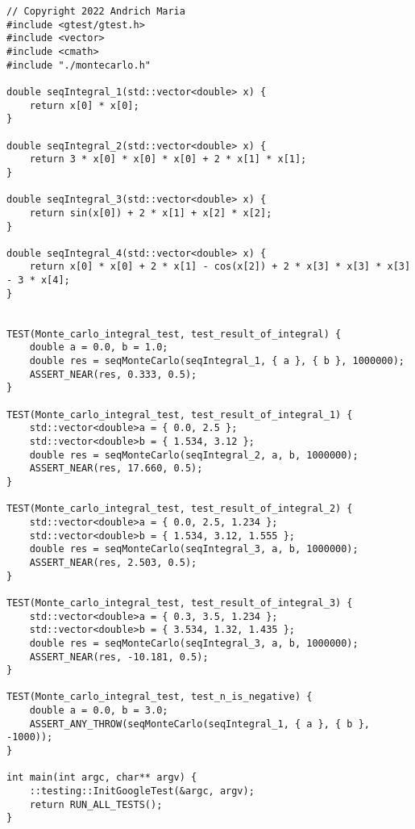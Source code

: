 \documentclass{report}
\begin{document}
\begin{lstlisting}
// Copyright 2022 Andrich Maria
#include <gtest/gtest.h>
#include <vector>
#include <cmath>
#include "./montecarlo.h"

double seqIntegral_1(std::vector<double> x) {
    return x[0] * x[0];
}

double seqIntegral_2(std::vector<double> x) {
    return 3 * x[0] * x[0] * x[0] + 2 * x[1] * x[1];
}

double seqIntegral_3(std::vector<double> x) {
    return sin(x[0]) + 2 * x[1] + x[2] * x[2];
}

double seqIntegral_4(std::vector<double> x) {
    return x[0] * x[0] + 2 * x[1] - cos(x[2]) + 2 * x[3] * x[3] * x[3] - 3 * x[4];
}


TEST(Monte_carlo_integral_test, test_result_of_integral) {
    double a = 0.0, b = 1.0;
    double res = seqMonteCarlo(seqIntegral_1, { a }, { b }, 1000000);
    ASSERT_NEAR(res, 0.333, 0.5);
}

TEST(Monte_carlo_integral_test, test_result_of_integral_1) {
    std::vector<double>a = { 0.0, 2.5 };
    std::vector<double>b = { 1.534, 3.12 };
    double res = seqMonteCarlo(seqIntegral_2, a, b, 1000000);
    ASSERT_NEAR(res, 17.660, 0.5);
}

TEST(Monte_carlo_integral_test, test_result_of_integral_2) {
    std::vector<double>a = { 0.0, 2.5, 1.234 };
    std::vector<double>b = { 1.534, 3.12, 1.555 };
    double res = seqMonteCarlo(seqIntegral_3, a, b, 1000000);
    ASSERT_NEAR(res, 2.503, 0.5);
}

TEST(Monte_carlo_integral_test, test_result_of_integral_3) {
    std::vector<double>a = { 0.3, 3.5, 1.234 };
    std::vector<double>b = { 3.534, 1.32, 1.435 };
    double res = seqMonteCarlo(seqIntegral_3, a, b, 1000000);
    ASSERT_NEAR(res, -10.181, 0.5);
}

TEST(Monte_carlo_integral_test, test_n_is_negative) {
    double a = 0.0, b = 3.0;
    ASSERT_ANY_THROW(seqMonteCarlo(seqIntegral_1, { a }, { b }, -1000));
}

int main(int argc, char** argv) {
    ::testing::InitGoogleTest(&argc, argv);
    return RUN_ALL_TESTS();
}
\end{lstlisting}
\end{document}
